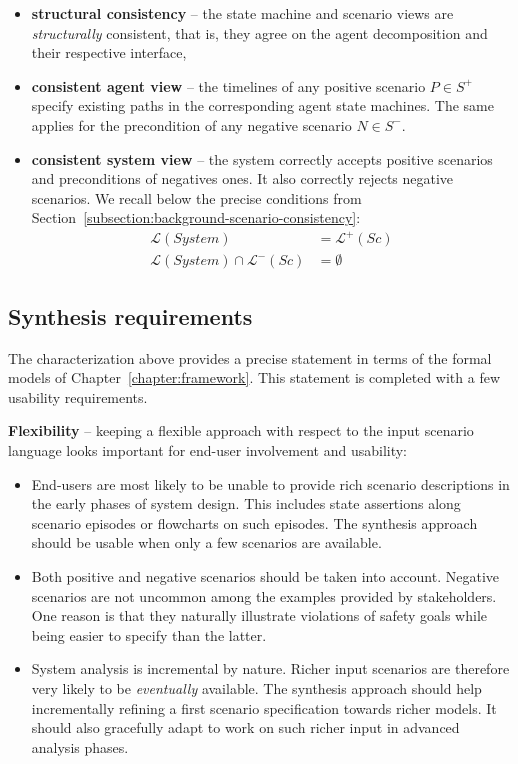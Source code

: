 \begin{itemize}
\item \textbf{structural consistency} -- the state machine and scenario views are \emph{structurally} consistent, that is, they agree on the agent decomposition and their respective interface,
\item \textbf{consistent agent view} -- the timelines of any positive scenario $P \in S^+$ specify existing paths in the corresponding agent state machines. The same applies for the precondition of any negative scenario $N \in S^-$.
\item \textbf{consistent system view} -- the system correctly accepts positive scenarios and preconditions of negatives ones. It also correctly rejects negative scenarios. We recall below the precise conditions from Section~\ref{subsection:background-scenario-consistency}:
\begin{align*}
\mathcal{L}(System) &= \mathcal{L}^+(Sc)\\
\mathcal{L}(System) \cap \mathcal{L}^-(Sc) &= \emptyset
\end{align*}

\end{itemize}


\subsection{Synthesis requirements\label{subsection:inductive-synthesis-requirements}}

The characterization above provides a precise statement in terms of the formal models of Chapter~\ref{chapter:framework}. This statement is completed with a few usability requirements.

\noindent \textbf{Flexibility} -- keeping a flexible approach with respect to the input scenario language looks important for end-user involvement and usability:
\begin{itemize}

\item End-users are most likely to be unable to provide rich scenario descriptions in the early phases of system design. This includes state assertions along scenario episodes or flowcharts on such episodes. The synthesis approach should be usable when only a few scenarios are available.

\item Both positive and negative scenarios should be taken into account. Negative scenarios are not uncommon among the examples provided by stakeholders. One reason is that they naturally illustrate violations of safety goals while being easier to specify than the latter. 

\item System analysis is incremental by nature. Richer input scenarios are therefore very likely to be \emph{eventually} available. The synthesis approach should help incrementally refining a first scenario specification towards richer models. It should also gracefully adapt to work on such richer input in advanced analysis phases.

\end{itemize}

